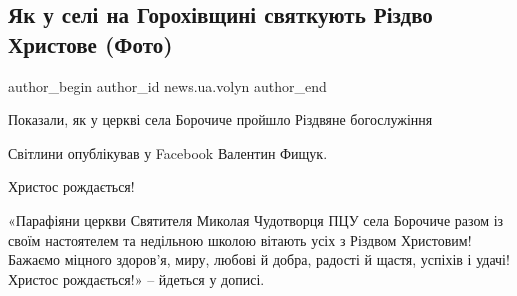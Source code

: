  
 
 
 
 
\subsection{Як у селі на Горохівщині святкують Різдво Христове (Фото)}
\label{sec:07_01_2022.stz.news.ua.volyn.2.rizdvo_selo}

\ifcmt
 author_begin
   author_id news.ua.volyn
 author_end
\fi

\begin{zznagolos}
Показали, як у церкві села Борочиче пройшло Різдвяне богослужіння	
\end{zznagolos}

Світлини опублікував у Facebook Валентин Фищук.

\begin{zznagolos}
Христос рождається!
\end{zznagolos}

«Парафіяни церкви Святителя Миколая Чудотворця ПЦУ села Борочиче разом із своїм
настоятелем та недільною школою вітають усіх з Різдвом Христовим! Бажаємо
міцного здоров'я, миру, любові й добра, радості й щастя, успіхів і удачі!
Христос рождається!» – йдеться у дописі.


